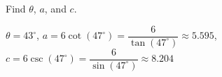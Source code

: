 {Find $\theta$, $a$, and $c$.

\begin{center}
\end{center}}
{$\theta = 43^{\circ}$, $a = 6\cot(47^{\circ}) = \dfrac{6}{\tan(47^{\circ})} \approx 5.595$, $c = 6\csc(47^{\circ}) = \dfrac{6}{\sin(47^{\circ})} \approx 8.204$}